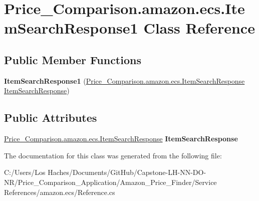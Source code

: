 \hypertarget{class_price___comparison_1_1amazon_1_1ecs_1_1_item_search_response1}{\section{Price\-\_\-\-Comparison.\-amazon.\-ecs.\-Item\-Search\-Response1 Class Reference}
\label{class_price___comparison_1_1amazon_1_1ecs_1_1_item_search_response1}
}
\subsection*{Public Member Functions}
\begin{DoxyCompactItemize}
\item 
\hypertarget{class_price___comparison_1_1amazon_1_1ecs_1_1_item_search_response1_abc6268af3e9aa6d0bfa4bf3dea75656b}{{\bfseries Item\-Search\-Response1} (\hyperlink{class_price___comparison_1_1amazon_1_1ecs_1_1_item_search_response}{Price\-\_\-\-Comparison.\-amazon.\-ecs.\-Item\-Search\-Response} \hyperlink{class_price___comparison_1_1amazon_1_1ecs_1_1_item_search_response}{Item\-Search\-Response})}\label{class_price___comparison_1_1amazon_1_1ecs_1_1_item_search_response1_abc6268af3e9aa6d0bfa4bf3dea75656b}

\end{DoxyCompactItemize}
\subsection*{Public Attributes}
\begin{DoxyCompactItemize}
\item 
\hypertarget{class_price___comparison_1_1amazon_1_1ecs_1_1_item_search_response1_aaa0d6f15d24e2d377ba5f4e45db1f84b}{\hyperlink{class_price___comparison_1_1amazon_1_1ecs_1_1_item_search_response}{Price\-\_\-\-Comparison.\-amazon.\-ecs.\-Item\-Search\-Response} {\bfseries Item\-Search\-Response}}\label{class_price___comparison_1_1amazon_1_1ecs_1_1_item_search_response1_aaa0d6f15d24e2d377ba5f4e45db1f84b}

\end{DoxyCompactItemize}


The documentation for this class was generated from the following file\-:\begin{DoxyCompactItemize}
\item 
C\-:/\-Users/\-Los Haches/\-Documents/\-Git\-Hub/\-Capstone-\/\-L\-H-\/\-N\-N-\/\-D\-O-\/\-N\-R/\-Price\-\_\-\-Comparison\-\_\-\-Application/\-Amazon\-\_\-\-Price\-\_\-\-Finder/\-Service References/amazon.\-ecs/Reference.\-cs\end{DoxyCompactItemize}
